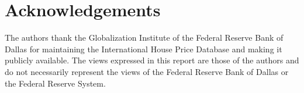 \section*{Acknowledgements}

The authors thank the Globalization Institute of the Federal Reserve Bank of
Dallas for maintaining the International House Price Database and making it
publicly available. The views expressed in this report are those of the
authors and do not necessarily represent the views of the Federal Reserve
Bank of Dallas or the Federal Reserve System.
